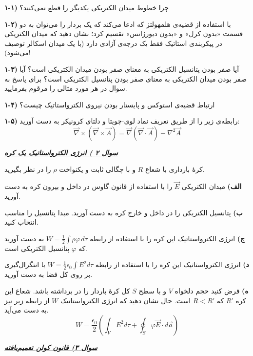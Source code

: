 \documentclass[11pt,a4paper]{article}
\begin{document}
\textbf{۱-۱)} چرا خطوط میدان الکتریکی یکدیگر را قطع نمی‌کنند؟

\textbf{۱-۲)} با استفاده از قضیه‌ی هلمهولتز که ادعا می‌کند که یک بردار را می‌توان به دو قسمت «بدون کرل» و «بدون دیورژانس» تقسیم کرد؛ نشان دهید که میدان الکتریکی در پیکربندی استاتیک فقط یک درجه‌ی آزادی دارد (با یک میدان اسکالر توصیف می‌شود)!

\textbf{۱-۳)} آیا صفر بودن پتانسیل الکتریکی به معنای صفر بودن میدان الکتریکی است؟ آیا صفر بودن میدان الکتریکی به معنای صفر بودن پتانسیل الکتریکی است؟ برای پاسخ به سوال در هر مورد مثالی را مرقوم بفرمایید.

\textbf{۱-۴)} ارتباط قضیه‌ی استوکس و پایستار بودن نیروی الکترواستاتیک چیست؟

\textbf{۱-۵)} رابطه‌ی زیر را از طریق تعریف نماد لوی-چویتا و دلتای کرونیکر به دست آورید:
\[
\vec{\nabla} \times (\vec{\nabla} \times \vec{A}) = \vec{\nabla}(\vec{\nabla} \cdot \vec{A}) - \nabla^2 \vec{A}
\]

\vspace{8pt}

\underline{\textbf{\textit{سوال ۲ ) انرژی الکترواستاتیک یک کره}}}

کرهٔ بارداری با شعاع $R$ و با چگالی ثابت و یکنواخت $\rho$ را در نظر بگیرید.

\textbf{الف)} میدان الکتریکی $\vec{E}$ را با استفاده از قانون گاوس در داخل و بیرون کره به دست آورید.

\textbf{ب)} پتانسیل الکتریکی را در داخل و خارج کره به دست آورید. مبدا پتانسیل را مناسب انتخاب کنید.

\textbf{ج)} انرژی الکترواستاتیک این کره را با استفاده از رابطه $W = \frac{1}{2} \int \rho \varphi \, d\tau$ به دست آورید که $\varphi$ پتانسیل الکتریکی است.

\textbf{د)} انرژی الکترواستاتیک این کره را با استفاده از رابطه $W = \frac{1}{2} \epsilon_0 \int E^2 d\tau$ با انتگرال‌گیری بر روی کل فضا به دست آورید.

\newpage

\textbf{ه)} فرض کنید حجم دلخواه $V$ و با سطح $S$ کل کرهٔ باردار را در برداشته باشد. شعاع این کره $R'$ که $R < R'$ است. حال نشان دهید که انرژی الکترواستاتیک $W$ از رابطه زیر نیز به دست می‌آید.
\[
W = \frac{\epsilon_0}{2} \left( \int_V E^2 d\tau + \oint_S \varphi \vec{E} \cdot d\vec{a} \right)
\]

\vspace{14pt}

\underline{\textbf{\textit{سوال ۳) قانون کولن تعمیم‌یافته}}}
\end{document}
